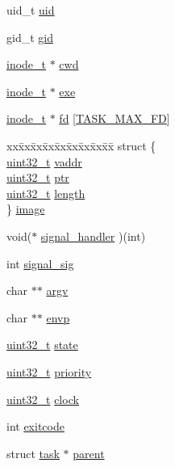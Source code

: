 \begin{DoxyCompactItemize}
\begin{tabbing}
\end{tabbing}\item 
uid\+\_\+t \hyperlink{structtask_ade8fc4c414bce856dacf9efee3031be8}{uid}
\item 
gid\+\_\+t \hyperlink{structtask_aaf3b6e15445e766a5c4823b815bca630}{gid}
\item 
\hyperlink{fs_8h_a48b686d0c4375b0d1aab2296dc36c7a6}{inode\+\_\+t} $\ast$ \hyperlink{structtask_a7099e7ba6a4c94559edfb4d396803b15}{cwd}
\item 
\hyperlink{fs_8h_a48b686d0c4375b0d1aab2296dc36c7a6}{inode\+\_\+t} $\ast$ \hyperlink{structtask_a22a59fcfc18d5f671340669f96571768}{exe}
\item 
\hyperlink{fs_8h_a48b686d0c4375b0d1aab2296dc36c7a6}{inode\+\_\+t} $\ast$ \hyperlink{structtask_afeeb6bafaefe505e6a730dd4e0be5a1a}{fd} \mbox{[}\hyperlink{task_8h_aa0beab24d02a2ccd5d273dea188af93d}{T\+A\+S\+K\+\_\+\+M\+A\+X\+\_\+\+F\+D}\mbox{]}
\item 
\begin{tabbing}
xx\=xx\=xx\=xx\=xx\=xx\=xx\=xx\=xx\=\kill
struct \{\\
\>\hyperlink{aplus_8h_a53a0df51603c77c2aa5b9ea61b606a82}{uint32\_t} \hyperlink{structtask_a340cbedbdc4b542793e7677dd4966ade}{vaddr}\\
\>\hyperlink{aplus_8h_a53a0df51603c77c2aa5b9ea61b606a82}{uint32\_t} \hyperlink{structtask_afbc0623ab058e402e92ea084dc37ab6a}{ptr}\\
\>\hyperlink{aplus_8h_a53a0df51603c77c2aa5b9ea61b606a82}{uint32\_t} \hyperlink{structtask_aa90dc3e7e232d6ba3f04700b3197b366}{length}\\
\} \hyperlink{structtask_a3eac6c8a544ff49a836c5eed9ec48107}{image}\\

\end{tabbing}\item 
void($\ast$ \hyperlink{structtask_aea4c9382e5f4f148a0a74c0680729cf0}{signal\+\_\+handler} )(int)
\item 
int \hyperlink{structtask_a3d6991558f05258094bbef5c47073928}{signal\+\_\+sig}
\item 
char $\ast$$\ast$ \hyperlink{structtask_a91e7540d20695c7439f7d0755a7a0545}{argv}
\item 
char $\ast$$\ast$ \hyperlink{structtask_a09fbc78d666a0b49e2e2064121d28364}{envp}
\item 
\hyperlink{aplus_8h_a53a0df51603c77c2aa5b9ea61b606a82}{uint32\+\_\+t} \hyperlink{structtask_a09ebd490ccb87f169fd7c3d8d95b4f39}{state}
\item 
\hyperlink{aplus_8h_a53a0df51603c77c2aa5b9ea61b606a82}{uint32\+\_\+t} \hyperlink{structtask_a9ab46b5a6e7c471f1fe32db13e6636a2}{priority}
\item 
\hyperlink{aplus_8h_a53a0df51603c77c2aa5b9ea61b606a82}{uint32\+\_\+t} \hyperlink{structtask_a8a31c6648c1b1869bfa069f4a969b0ad}{clock}
\item 
int \hyperlink{structtask_a9bd7bbd83fe1f4744c76ff240b6da5db}{exitcode}
\item 
struct \hyperlink{structtask}{task} $\ast$ \hyperlink{structtask_a34c6613744820a1e8127756fb6a5392c}{parent}
\end{DoxyCompactItemize}


